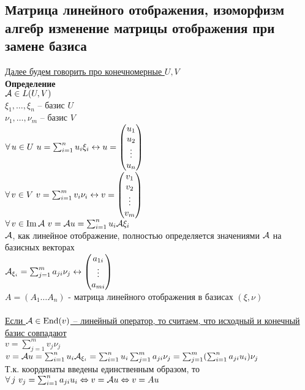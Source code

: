 \documentclass[12pt]{article}
\begin{document}
\subsection{Матрица линейного отображения, изоморфизм алгебр изменение матрицы отображения при замене базиса}
\underline{Далее будем говорить про конечномерные $U, V$}\\
\textbf{Определение}\\
$\mathcal{A} \in L(U, V)$\\
$\xi_1, \ldots, \xi_n$ -- базис $U$\\
$\nu_1, \ldots, \nu_m$ -- базис $V$\\
$\forall\, u \in U\ u = \sum_{i = 1}^n u_i \xi_i \leftrightarrow u = \begin{pmatrix}
u_1\\u_2\\\vdots\\u_n
\end{pmatrix}$\\
$\forall\, v \in V\ v = \sum_{i = 1}^m v_i \nu_i \leftrightarrow v = \begin{pmatrix}
v_1\\v_2\\\vdots\\v_m
\end{pmatrix}$\\
$\forall\, v \in \operatorname{Im} \mathcal{A}\ v = \mathcal{A} u = \sum_{i=1}^n u_i \mathcal{A} \xi_i$\\
$\mathcal{A}$, как линейное отображение, полностью определяется значениями $\mathcal{A}$ на базисных векторах\\
$\mathcal{A}_{\xi_i} = \sum_{j=1}^m a_{ji} \nu_j \leftrightarrow \begin{pmatrix}
    a_{1i}\\\vdots\\a_{mi}
\end{pmatrix}$\\
$A = (A_1 \ldots A_n)$ - матрица линейного отображения в базисах $(\xi, \nu)$\\\\
\underline{Если $\mathcal{A} \in \operatorname{End}(v)$ -- линейный оператор, то считаем, что исходный и конечный базис совпадают}\\
$v = \sum_{j=1}^m v_j \nu_j$\\
$v = \mathcal{A} u = \sum_{i = 1}^n u_i \mathcal{A}_{\xi_i} = \sum_{i=1}^n u_i\sum_{j=1}^m a_{ji}\nu_j = \sum_{j=1}^m(\sum_{i=1}^n a_{ji}u_i)\nu_j$\\
Т.к. координаты введены единственным образом, то $\forall\, j\ v_j = \sum_{i=1}^n a_{ji}u_i \Leftrightarrow v = \mathcal{A} u \Leftrightarrow v = Au$\\
\end{document}
